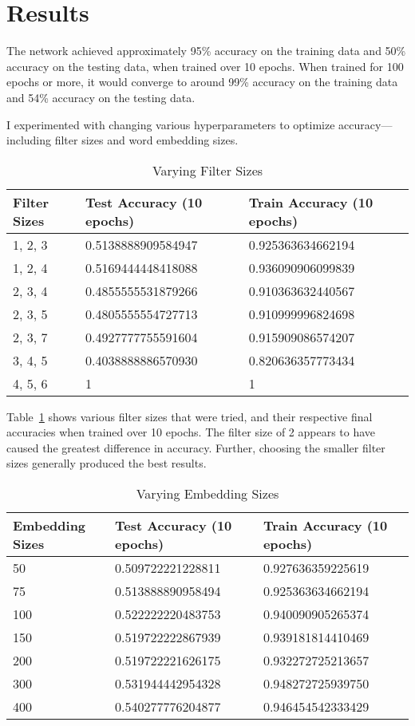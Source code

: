 \documentclass{article}
\begin{document}
\section{Results}
The network achieved approximately 95\% accuracy on the training data and 50\% accuracy on the testing data, when trained over 10 epochs. When trained
for 100 epochs or more, it would converge to around 99\% accuracy on the training data and 54\% accuracy on the testing data.

I experimented with changing various hyperparameters to optimize accuracy—including filter sizes and word embedding sizes.

\begin{table}[t]
  \caption{Varying Filter Sizes}
  \label{tab:filter_sizes}
  \centering
  \begin{tabular}{lll}
    \toprule
    Filter Sizes & Test Accuracy (10 epochs) & Train Accuracy (10 epochs) \\
    \midrule
    1, 2, 3 & 0.5138888909584947 & 0.925363634662194 \\
    1, 2, 4 & 0.5169444448418088 & 0.936090906099839 \\
    2, 3, 4 & 0.4855555531879266 & 0.910363632440567 \\
    2, 3, 5 & 0.4805555554727713 & 0.910999996824698 \\
    2, 3, 7 & 0.4927777755591604 & 0.915909086574207 \\
    3, 4, 5 & 0.4038888886570930 & 0.820636357773434 \\
    4, 5, 6 & 1 & 1 \\
    \bottomrule
  \end{tabular}
\end{table}

Table~\ref{tab:filter_sizes} shows various filter sizes that were tried, and their respective final accuracies when trained over 10 epochs.
The filter size of 2 appears to have caused the greatest difference in accuracy. Further, choosing the smaller filter sizes generally
produced the best results.

\begin{table}[t]
  \caption{Varying Embedding Sizes}
  \label{tab:embedding_sizes}
  \centering
  \begin{tabular}{lll}
    \toprule
    Embedding Sizes & Test Accuracy (10 epochs) & Train Accuracy (10 epochs) \\
    \midrule
    50 & 0.509722221228811 & 0.927636359225619 \\
    75 & 0.513888890958494 & 0.925363634662194 \\
    100 & 0.522222220483753 & 0.940090905265374 \\
    150 & 0.519722222867939 & 0.939181814410469 \\
    200 & 0.519722221626175 & 0.932272725213657 \\
    300 & 0.531944442954328 & 0.948272725939750 \\
    400 & 0.540277776204877 & 0.946454542333429 \\
    \bottomrule
  \end{tabular}
\end{table}
\end{document}
